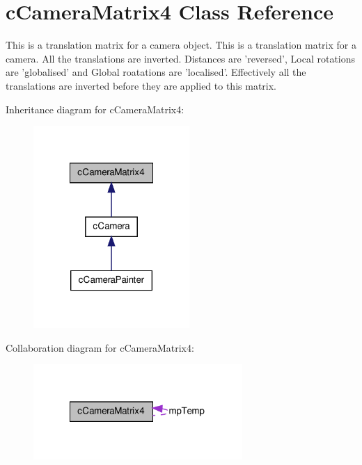 \hypertarget{classc_camera_matrix4}{
\section{cCameraMatrix4 Class Reference}
\label{classc_camera_matrix4}
}


This is a translation matrix for a camera object. This is a translation matrix for a camera. All the translations are inverted. Distances are 'reversed', Local rotations are 'globalised' and Global roatations are 'localised'. Effectively all the translations are inverted before they are applied to this matrix.  




Inheritance diagram for cCameraMatrix4:
\nopagebreak
\begin{figure}[H]
\begin{center}
\leavevmode
\includegraphics[width=168pt]{classc_camera_matrix4__inherit__graph}
\end{center}
\end{figure}


Collaboration diagram for cCameraMatrix4:
\nopagebreak
\begin{figure}[H]
\begin{center}
\leavevmode
\includegraphics[width=225pt]{classc_camera_matrix4__coll__graph}
\end{center}
\end{figure}

